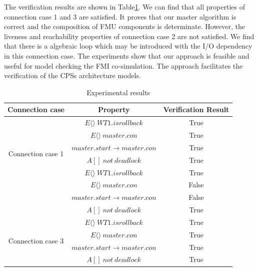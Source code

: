 The verification results are shown in Table\ref{rs}. We can find that all properties of connection case 1 and 3 are satisfied. It proves that our master algorithm is correct and the composition of FMU components is determinate. However, the liveness and reachability properties of connection case 2 are not satisfied. We find that there is a algebraic loop which may be introduced with the I/O dependency in this connection case. The experiments show that our approach is feasible and useful for model checking the FMI co-simulation. The approach facilitates the verification of the CPSs architecture models.
\begin{table}
\caption{Experimental results}
\centering
\begin{tabular}{c c c} 
        \hline  
        Connection case & Property & Verification Result\\
        \hline
        \multirow{6}{4.0cm}{Connection case 1}  
                & $E\langle\rangle~WT1.isrollback$ & True\\ 
                & $E\langle\rangle~master.con$ & True\\ 
                & $master.start\rightarrow master.con$ & True\\ 
                & $A[]~not~deadlock$ & True\\   
        \hline 
        \multirow{6}{4.0cm}{Connection case 2}  
                & $E\langle\rangle~WT1.isrollback$ & True\\ 
                & $E\langle\rangle~master.con$ & False\\ 
                & $master.start\rightarrow master.con$ & False\\ 
                & $A[]~not~deadlock$ & True\\   
        \hline 
        \multirow{6}{4.0cm}{Connection case 3}  
                & $E\langle\rangle~WT1.isrollback$ & True\\ 
                & $E\langle\rangle~master.con$ & True\\ 
                & $master.start \rightarrow master.con$ & True\\ 
                & $A[]~not~deadlock$ & True\\   
        \hline 
\end{tabular} 
\label{rs}
\end{table}




